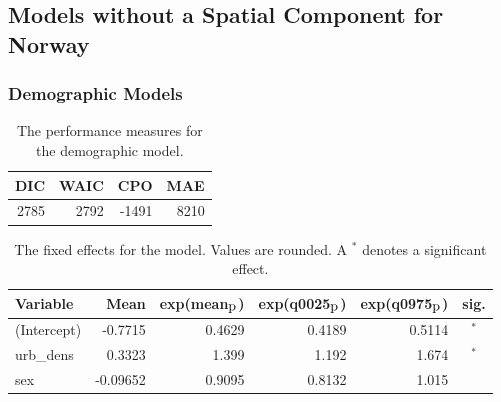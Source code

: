 \subsection{Models without a Spatial Component for Norway}
\subsubsection{Demographic Models}
\begin{table}[H] 
\caption{The performance measures for the demographic model. \label{demoNorway_nospatial}}
\begin{tabular}{r r r r}
\toprule\textbf{DIC}	& \textbf{WAIC} & \textbf{CPO} & \textbf{MAE}\\
\midrule
2785 & 2792 & -1491 & 8210 \\
\bottomrule
\end{tabular}
\end{table} 
\begin{table}[H]
\caption{The fixed effects for the model. Values are rounded. A $^*$ denotes a significant effect. \label{fixedDemoNorway_nospatial}}
\begin{tabular}{l r r r r c}
\toprule
\textbf{Variable}	& \textbf{Mean}	& \textbf{exp(mean$_{\hbox{p}}$)} & \textbf{exp(q0025$_{\hbox{p}}$)} & \textbf{exp(q0975$_{\hbox{p}}$)} & \textbf{sig.}\\
\midrule
(Intercept) & -0.7715 & 0.4629 & 0.4189 & 0.5114 & $^*$ \\
urb\_dens & 0.3323 & 1.399 & 1.192 & 1.674 & $^*$ \\
sex & -0.09652 & 0.9095 & 0.8132 & 1.015 \\
\bottomrule
\end{tabular}
\end{table}
